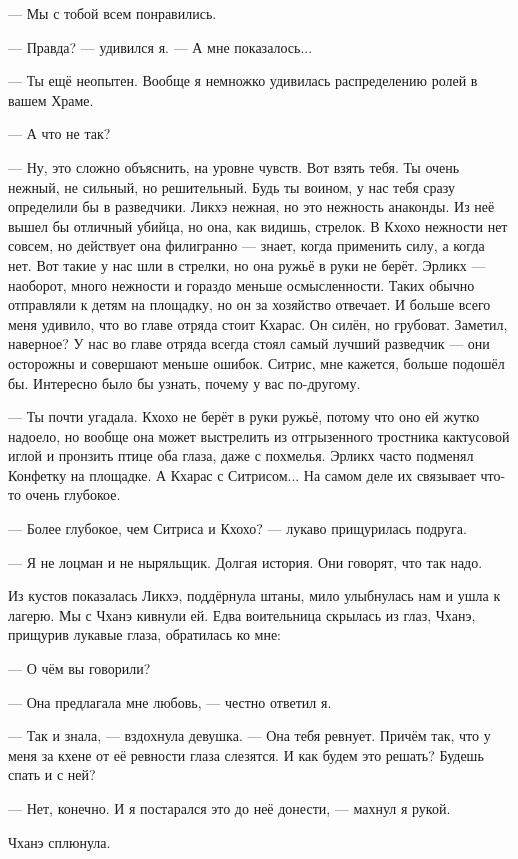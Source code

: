 --- Мы с тобой всем понравились.

--- Правда? --- удивился я.
--- А мне показалось...

--- Ты ещё неопытен.
Вообще я немножко удивилась распределению ролей в вашем Храме.

--- А что не так?

--- Ну, это сложно объяснить, на уровне чувств.
Вот взять тебя.
Ты очень нежный, не сильный, но решительный.
Будь ты воином, у нас тебя сразу определили бы в разведчики.
Ликхэ нежная, но это нежность анаконды.
Из неё вышел бы отличный убийца, но она, как видишь, стрелок.
В Кхохо нежности нет совсем, но действует она филигранно --- знает, когда применить силу, а когда нет.
Вот такие у нас шли в стрелки, но она ружьё в руки не берёт.
Эрликх --- наоборот, много нежности и гораздо меньше осмысленности.
Таких обычно отправляли к детям на площадку, но он за хозяйство отвечает.
И больше всего меня удивило, что во главе отряда стоит Кхарас.
Он силён, но грубоват.
Заметил, наверное?
У нас во главе отряда всегда стоял самый лучший разведчик --- они осторожны и совершают меньше ошибок.
Ситрис, мне кажется, больше подошёл бы.
Интересно было бы узнать, почему у вас по-другому.

--- Ты почти угадала.
Кхохо не берёт в руки ружьё, потому что оно ей жутко надоело, но вообще она может выстрелить из отгрызенного тростника кактусовой иглой и пронзить птице оба глаза, даже с похмелья.
Эрликх часто подменял Конфетку на площадке.
А Кхарас с Ситрисом...
На самом деле их связывает что-то очень глубокое.

--- Более глубокое, чем Ситриса и Кхохо? --- лукаво прищурилась подруга.

--- Я не лоцман и не ныряльщик.
Долгая история.
Они говорят, что так надо.

Из кустов показалась Ликхэ, поддёрнула штаны, мило улыбнулась нам и ушла к лагерю.
Мы с Чханэ кивнули ей.
Едва воительница скрылась из глаз, Чханэ, прищурив лукавые глаза, обратилась ко мне:

--- О чём вы говорили?

--- Она предлагала мне любовь, --- честно ответил я.

--- Так и знала, --- вздохнула девушка.
--- Она тебя ревнует.
Причём так, что у меня за кхене от её ревности глаза слезятся.
И как будем это решать?
Будешь спать и с ней?

--- Нет, конечно.
И я постарался это до неё донести, --- махнул я рукой.

Чханэ сплюнула.

